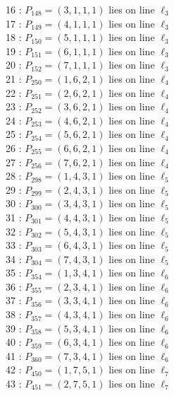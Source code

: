 \documentclass{article}
\begin{document}
{\begin{multicols}{2}
16 : $P_{148}=( 3, 1, 1, 1 )$ lies on line $\ell_{3}$\\
17 : $P_{149}=( 4, 1, 1, 1 )$ lies on line $\ell_{3}$\\
18 : $P_{150}=( 5, 1, 1, 1 )$ lies on line $\ell_{3}$\\
19 : $P_{151}=( 6, 1, 1, 1 )$ lies on line $\ell_{3}$\\
20 : $P_{152}=( 7, 1, 1, 1 )$ lies on line $\ell_{3}$\\
21 : $P_{250}=( 1, 6, 2, 1 )$ lies on line $\ell_{4}$\\
22 : $P_{251}=( 2, 6, 2, 1 )$ lies on line $\ell_{4}$\\
23 : $P_{252}=( 3, 6, 2, 1 )$ lies on line $\ell_{4}$\\
24 : $P_{253}=( 4, 6, 2, 1 )$ lies on line $\ell_{4}$\\
25 : $P_{254}=( 5, 6, 2, 1 )$ lies on line $\ell_{4}$\\
26 : $P_{255}=( 6, 6, 2, 1 )$ lies on line $\ell_{4}$\\
27 : $P_{256}=( 7, 6, 2, 1 )$ lies on line $\ell_{4}$\\
28 : $P_{298}=( 1, 4, 3, 1 )$ lies on line $\ell_{5}$\\
29 : $P_{299}=( 2, 4, 3, 1 )$ lies on line $\ell_{5}$\\
30 : $P_{300}=( 3, 4, 3, 1 )$ lies on line $\ell_{5}$\\
31 : $P_{301}=( 4, 4, 3, 1 )$ lies on line $\ell_{5}$\\
32 : $P_{302}=( 5, 4, 3, 1 )$ lies on line $\ell_{5}$\\
33 : $P_{303}=( 6, 4, 3, 1 )$ lies on line $\ell_{5}$\\
34 : $P_{304}=( 7, 4, 3, 1 )$ lies on line $\ell_{5}$\\
35 : $P_{354}=( 1, 3, 4, 1 )$ lies on line $\ell_{6}$\\
36 : $P_{355}=( 2, 3, 4, 1 )$ lies on line $\ell_{6}$\\
37 : $P_{356}=( 3, 3, 4, 1 )$ lies on line $\ell_{6}$\\
38 : $P_{357}=( 4, 3, 4, 1 )$ lies on line $\ell_{6}$\\
39 : $P_{358}=( 5, 3, 4, 1 )$ lies on line $\ell_{6}$\\
40 : $P_{359}=( 6, 3, 4, 1 )$ lies on line $\ell_{6}$\\
41 : $P_{360}=( 7, 3, 4, 1 )$ lies on line $\ell_{6}$\\
42 : $P_{450}=( 1, 7, 5, 1 )$ lies on line $\ell_{7}$\\
43 : $P_{451}=( 2, 7, 5, 1 )$ lies on line $\ell_{7}$\\

\end{multicols}}
\end{document}
